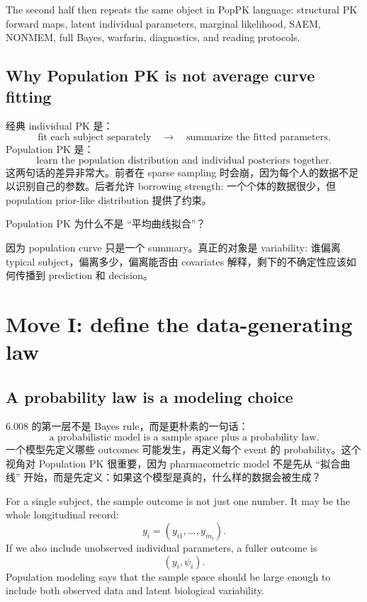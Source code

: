 \documentclass[a4paper]{article}
\begin{document}
The second half then repeats the same object in PopPK language: structural PK forward maps, latent individual parameters, marginal likelihood, SAEM, NONMEM, full Bayes, warfarin, diagnostics, and reading protocols.

\subsection{Why Population PK is not average curve fitting}

经典 individual PK 是：
\[
  \text{fit each subject separately} \quad \longrightarrow \quad
  \text{summarize the fitted parameters}.
\]
Population PK 是：
\[
  \text{learn the population distribution and individual posteriors together}.
\]
这两句话的差异非常大。前者在 sparse sampling 时会崩，因为每个人的数据不足以识别自己的参数。后者允许 borrowing strength: 一个个体的数据很少，但 population prior-like distribution 提供了约束。

\begin{question}
  Population PK 为什么不是 ``平均曲线拟合''？
\end{question}

因为 population curve 只是一个 summary。真正的对象是 variability: 谁偏离 typical subject，偏离多少，偏离能否由 covariates 解释，剩下的不确定性应该如何传播到 prediction 和 decision。

\section{Move I: define the data-generating law}

\subsection{A probability law is a modeling choice}

6.008 的第一层不是 Bayes rule，而是更朴素的一句话：
\[
  \text{a probabilistic model is a sample space plus a probability law}.
\]
一个模型先定义哪些 outcomes 可能发生，再定义每个 event 的 probability。这个视角对 Population PK 很重要，因为 pharmacometric model 不是先从 ``拟合曲线'' 开始，而是先定义：如果这个模型是真的，什么样的数据会被生成？

For a single subject, the sample outcome is not just one number. It may be the whole longitudinal record:
\[
  y_i=(y_{i1},\ldots,y_{in_i}).
\]
If we also include unobserved individual parameters, a fuller outcome is
\[
  (y_i,\psi_i).
\]
Population modeling says that the sample space should be large enough to include both observed data and latent biological variability.
\end{document}
